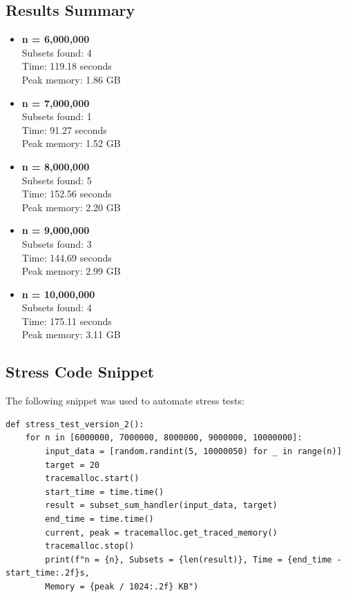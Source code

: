 \documentclass[11pt]{article}
\begin{document}
\subsection*{Results Summary}
\vspace{-0.5em}
\begin{itemize}
    \item \textbf{n = 6,000,000} \\
    Subsets found: 4 \\
    Time: 119.18 seconds \\
    Peak memory: 1.86 GB
    \item \textbf{n = 7,000,000} \\
    Subsets found: 1 \\
    Time: 91.27 seconds \\
    Peak memory: 1.52 GB
    \item \textbf{n = 8,000,000} \\
    Subsets found: 5 \\
    Time: 152.56 seconds \\
    Peak memory: 2.20 GB
    \item \textbf{n = 9,000,000} \\
    Subsets found: 3 \\
    Time: 144.69 seconds \\
    Peak memory: 2.99 GB
    \item \textbf{n = 10,000,000} \\
    Subsets found: 4 \\
    Time: 175.11 seconds \\
    Peak memory: 3.11 GB
\end{itemize}

\subsection*{Stress Code Snippet}
The following snippet was used to automate stress tests:

\vspace{0.5em}
\begin{verbatim}
def stress_test_version_2():
    for n in [6000000, 7000000, 8000000, 9000000, 10000000]:
        input_data = [random.randint(5, 10000050) for _ in range(n)]
        target = 20
        tracemalloc.start()
        start_time = time.time()
        result = subset_sum_handler(input_data, target)
        end_time = time.time()
        current, peak = tracemalloc.get_traced_memory()
        tracemalloc.stop()
        print(f"n = {n}, Subsets = {len(result)}, Time = {end_time - start_time:.2f}s,
        Memory = {peak / 1024:.2f} KB")
\end{verbatim}
\vspace{7em}
\end{document}
